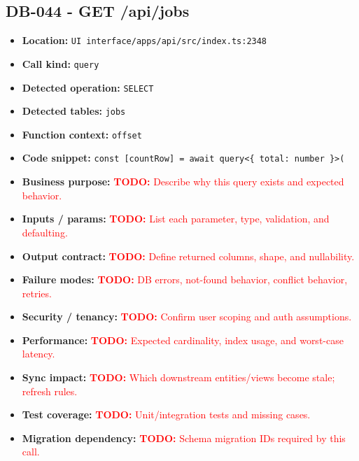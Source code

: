 \documentclass[11pt]{article}
\newcommand{\todoitem}[1]{\textcolor{red}{\textbf{TODO:} #1}}
\begin{document}
\subsection{DB-044 - GET /api/jobs}
\begin{itemize}[leftmargin=1.5em]
\item \textbf{Location:} \texttt{UI interface/apps/api/src/index.ts:2348}
\item \textbf{Call kind:} \texttt{query}
\item \textbf{Detected operation:} \texttt{SELECT}
\item \textbf{Detected tables:} \texttt{jobs}
\item \textbf{Function context:} \texttt{offset}
\item \textbf{Code snippet:} \texttt{const [countRow] = await query<\{ total: number \}>(}
\item \textbf{Business purpose:} \todoitem{Describe why this query exists and expected behavior.}
\item \textbf{Inputs / params:} \todoitem{List each parameter, type, validation, and defaulting.}
\item \textbf{Output contract:} \todoitem{Define returned columns, shape, and nullability.}
\item \textbf{Failure modes:} \todoitem{DB errors, not-found behavior, conflict behavior, retries.}
\item \textbf{Security / tenancy:} \todoitem{Confirm user scoping and auth assumptions.}
\item \textbf{Performance:} \todoitem{Expected cardinality, index usage, and worst-case latency.}
\item \textbf{Sync impact:} \todoitem{Which downstream entities/views become stale; refresh rules.}
\item \textbf{Test coverage:} \todoitem{Unit/integration tests and missing cases.}
\item \textbf{Migration dependency:} \todoitem{Schema migration IDs required by this call.}
\end{itemize}
\end{document}
